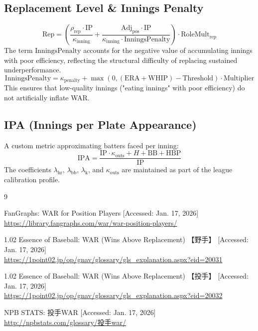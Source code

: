 \documentclass[uplatex,a4paper,11pt,dvipdfmx]{jsarticle}
\newcommand{\mvar}[1]{\mathrm{#1}}
\newcommand{\refurl}[1]{{\small \url{#1}}}
\begin{document}
\subsection{Replacement Level \& Innings Penalty}
\begin{equation}
\mvar{Rep} = \left( \frac{\rho_{\text{rep}} \cdot \mvar{IP}}{\kappa_{\text{inning}}} + \frac{\mvar{Adj}_{\text{pos}} \cdot \mvar{IP}}{\kappa_{\text{inning}} \cdot \mvar{InningsPenalty}} \right) \cdot \mvar{RoleMult}_{\text{rep}}
\end{equation}
The term $\mvar{InningsPenalty}$ accounts for the negative value of accumulating innings with poor efficiency, reflecting the structural difficulty of replacing sustained underperformance.
\begin{equation}
\mvar{InningsPenalty} = \kappa_{\text{penalty}} + \max(0, (\mvar{ERA}+\mvar{WHIP}) - \mvar{Threshold}) \cdot \mvar{Multiplier}
\end{equation}
This ensures that low-quality innings ("eating innings" with poor efficiency) do not artificially inflate WAR.

\subsection{IPA (Innings per Plate Appearance)}
A custom metric approximating batters faced per inning:
\begin{equation}
\mvar{IPA} = \frac{\mvar{IP} \cdot \kappa_{\text{outs}} + H + \mvar{BB} + \mvar{HBP}}{\mvar{IP}}
\end{equation}
The coefficients $\lambda_{\text{hr}}$, $\lambda_{\text{bb}}$, $\lambda_{\text{k}}$, and $\kappa_{\text{outs}}$ are maintained as part of the league calibration profile.

\begin{thebibliography}{9}

FanGraphs: WAR for Position Players [Accessed: Jan. 17, 2026] \\
\refurl{https://library.fangraphs.com/war/war-position-players/}

1.02 Essence of Baseball: WAR (Wins Above Replacement) 【野手】 [Accessed: Jan. 17, 2026] \\
\refurl{https://1point02.jp/op/gnav/glossary/gls_explanation.aspx?eid=20031}

1.02 Essence of Baseball: WAR (Wins Above Replacement) 【投手】 [Accessed: Jan. 17, 2026] \\
\refurl{https://1point02.jp/op/gnav/glossary/gls_explanation.aspx?eid=20032}

NPB STATS: 投手WAR [Accessed: Jan. 17, 2026] \\
\refurl{http://npbstats.com/glossary/投手war/}

\end{thebibliography}
\end{document}
